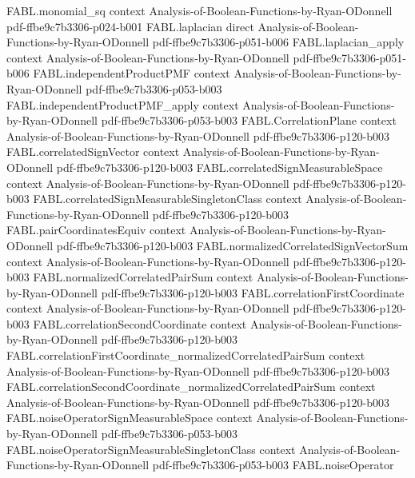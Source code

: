 \begin{theorem}
\proofstep
  {FABL.monomial_sq}
  {context}
  {Analysis-of-Boolean-Functions-by-Ryan-ODonnell}
  {pdf-ffbe9c7b3306-p024-b001}
\proofstep
  {FABL.laplacian}
  {direct}
  {Analysis-of-Boolean-Functions-by-Ryan-ODonnell}
  {pdf-ffbe9c7b3306-p051-b006}
\proofstep
  {FABL.laplacian_apply}
  {context}
  {Analysis-of-Boolean-Functions-by-Ryan-ODonnell}
  {pdf-ffbe9c7b3306-p051-b006}
\proofstep
  {FABL.independentProductPMF}
  {context}
  {Analysis-of-Boolean-Functions-by-Ryan-ODonnell}
  {pdf-ffbe9c7b3306-p053-b003}
\proofstep
  {FABL.independentProductPMF_apply}
  {context}
  {Analysis-of-Boolean-Functions-by-Ryan-ODonnell}
  {pdf-ffbe9c7b3306-p053-b003}
\proofstep
  {FABL.CorrelationPlane}
  {context}
  {Analysis-of-Boolean-Functions-by-Ryan-ODonnell}
  {pdf-ffbe9c7b3306-p120-b003}
\proofstep
  {FABL.correlatedSignVector}
  {context}
  {Analysis-of-Boolean-Functions-by-Ryan-ODonnell}
  {pdf-ffbe9c7b3306-p120-b003}
\proofstep
  {FABL.correlatedSignMeasurableSpace}
  {context}
  {Analysis-of-Boolean-Functions-by-Ryan-ODonnell}
  {pdf-ffbe9c7b3306-p120-b003}
\proofstep
  {FABL.correlatedSignMeasurableSingletonClass}
  {context}
  {Analysis-of-Boolean-Functions-by-Ryan-ODonnell}
  {pdf-ffbe9c7b3306-p120-b003}
\proofstep
  {FABL.pairCoordinatesEquiv}
  {context}
  {Analysis-of-Boolean-Functions-by-Ryan-ODonnell}
  {pdf-ffbe9c7b3306-p120-b003}
\proofstep
  {FABL.normalizedCorrelatedSignVectorSum}
  {context}
  {Analysis-of-Boolean-Functions-by-Ryan-ODonnell}
  {pdf-ffbe9c7b3306-p120-b003}
\proofstep
  {FABL.normalizedCorrelatedPairSum}
  {context}
  {Analysis-of-Boolean-Functions-by-Ryan-ODonnell}
  {pdf-ffbe9c7b3306-p120-b003}
\proofstep
  {FABL.correlationFirstCoordinate}
  {context}
  {Analysis-of-Boolean-Functions-by-Ryan-ODonnell}
  {pdf-ffbe9c7b3306-p120-b003}
\proofstep
  {FABL.correlationSecondCoordinate}
  {context}
  {Analysis-of-Boolean-Functions-by-Ryan-ODonnell}
  {pdf-ffbe9c7b3306-p120-b003}
\proofstep
  {FABL.correlationFirstCoordinate_normalizedCorrelatedPairSum}
  {context}
  {Analysis-of-Boolean-Functions-by-Ryan-ODonnell}
  {pdf-ffbe9c7b3306-p120-b003}
\proofstep
  {FABL.correlationSecondCoordinate_normalizedCorrelatedPairSum}
  {context}
  {Analysis-of-Boolean-Functions-by-Ryan-ODonnell}
  {pdf-ffbe9c7b3306-p120-b003}
\proofstep
  {FABL.noiseOperatorSignMeasurableSpace}
  {context}
  {Analysis-of-Boolean-Functions-by-Ryan-ODonnell}
  {pdf-ffbe9c7b3306-p053-b003}
\proofstep
  {FABL.noiseOperatorSignMeasurableSingletonClass}
  {context}
  {Analysis-of-Boolean-Functions-by-Ryan-ODonnell}
  {pdf-ffbe9c7b3306-p053-b003}
\proofstep
  {FABL.noiseOperator}

\end{theorem}
